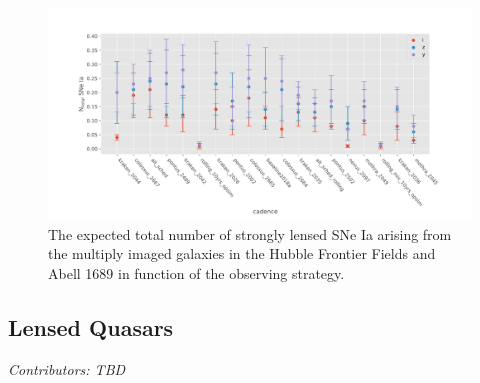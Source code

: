 \begin{figure}
\centering
\includegraphics[scale=0.65]{figures/galaxy_lensing.pdf}
\caption{The expected total number of strongly lensed SNe Ia arising from the multiply imaged galaxies in the Hubble Frontier Fields and Abell 1689 in function of the observing strategy. }
\end{figure}


\subsection{Lensed Quasars}
\textit{Contributors: TBD}



\FloatBarrier


